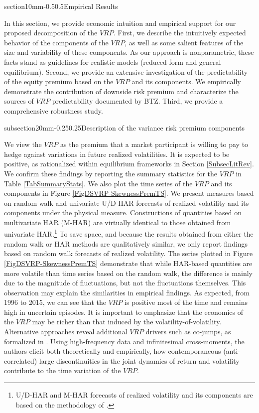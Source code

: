 \documentclass[11pt]{article}
\makeatletter
\renewcommand\subsection{\@startsection%
    {subsection}{2}{0mm}{-0.25\baselineskip}{0.25\baselineskip}{\bfseries\large}}
\renewcommand\section{\@startsection%
    {section}{1}{0mm}{-0.5\baselineskip}{0.5\baselineskip}{\bfseries\Large}}
\makeatother
\begin{document}
\section{Empirical Results}\label{SecEmpiricalResults}

In this section, we provide economic intuition and empirical support for our proposed decomposition of the $VRP$. First, we describe the intuitively expected behavior of the components of the $VRP$, as well as some salient features of the size and variability of these components. As our approach is nonparametric, these facts stand as guidelines for realistic models (reduced-form and general equilibrium). Second, we provide an extensive investigation of the predictability of the equity premium based on the $VRP$ and its components. We empirically demonstrate the contribution of downside risk premium and characterize the sources of $VRP$ predictability documented by BTZ. Third, we provide a comprehensive robustness study.

\subsection{Description of the variance risk premium components}\label{SecFacts}

We view the $VRP$ as the premium that a market participant is willing to pay to hedge against variations in future realized volatilities. It is expected to be positive, as rationalized within equilibrium frameworks in Section \ref{SubsecLitRev}. We confirm these findings by reporting the summary statistics for the $VRP$ in Table \ref{TabSummaryStats}. We also plot the time series of the $VRP$ and its components in Figure \ref{FigDSVRP-SkewnessPremTS}. We present measures based on random walk and univariate U/D-HAR forecasts of realized volatility and its components under the physical measure. Constructions of quantities based on multivariate HAR (M-HAR) are virtually identical to those obtained from univariate HAR.\footnote{U/D-HAR and M-HAR forecasts of realized volatility and its components are based on the methodology of \cite{Corsi09HAR}.} To save space, and because the results obtained from either the random walk or HAR methods are qualitatively similar, we only report findings based on random walk forecasts of realized volatility. The series plotted in Figure \ref{FigDSVRP-SkewnessPremTS} demonstrate that while HAR-based quantities are more volatile than time series based on the random walk, the difference is mainly due to the magnitude of fluctuations, but not the fluctuations themselves. This observation may explain the similarities in empirical findings. As expected, from 1996 to 2015, we can see that the $VRP$ is positive most of the time and remains high in uncertain episodes. It is important to emphasize that the economics of the $VRP$ may be richer than that induced by the volatility-of-volatility. Alternative approaches reveal additional $VRP$ drivers such as co-jumps, as formalized in \cite{BandiReno}. Using high-frequency data and infinitesimal cross-moments, the authors elicit both theoretically and empirically, how contemporaneous (anti-correlated) large discontinuities in the joint dynamics of return and volatility contribute to the time variation of the $VRP$.
\end{document}
